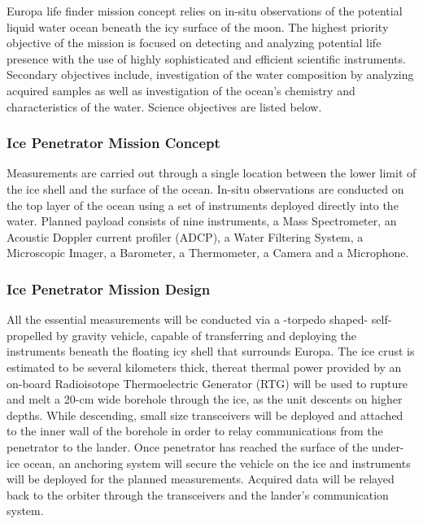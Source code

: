 Europa life finder mission concept relies on in-situ observations of the potential liquid water ocean beneath the icy surface of the moon. The highest priority objective of the mission is focused on detecting and analyzing potential life presence with the use of highly sophisticated and efficient scientific instruments. Secondary objectives include, investigation of the water composition by analyzing acquired samples as well as investigation of the ocean’s chemistry and characteristics of the water.
Science objectives are listed below.


\subsubsection{Ice Penetrator Mission Concept}

Measurements are carried out through a single location between the lower limit of the ice shell and the surface of the ocean. In-situ observations are conducted on the top layer of the ocean using a set of instruments deployed directly into the water.
Planned payload consists of nine instruments, a Mass Spectrometer, an Acoustic Doppler current profiler (ADCP), a Water Filtering System, a Microscopic Imager, a Barometer, a Thermometer, a Camera and a Microphone.

\subsubsection{Ice Penetrator Mission Design}

All the essential measurements will be conducted via a -torpedo shaped- self-propelled by gravity vehicle, capable of transferring and deploying the instruments beneath the floating icy shell that surrounds Europa. The ice crust is estimated to be several kilometers thick, thereat thermal power provided by an on-board Radioisotope Thermoelectric Generator (RTG) will be used to rupture and melt a 20-cm wide borehole through the ice, as the unit descents on higher depths. While descending, small size transceivers will be deployed and attached to the inner wall of the borehole in order to relay communications from the penetrator to the lander. Once penetrator has reached the surface of the under-ice ocean, an anchoring system will secure the vehicle on the ice and instruments will be deployed for the planned measurements. Acquired data will be relayed back to the orbiter through the transceivers and the lander’s communication system. 

